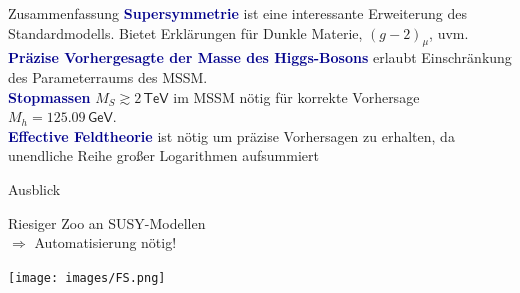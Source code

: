 \documentclass[hyperref={pdfpagelabels=false},ngerman]{beamer}
\newcommand{\eh}[1]{\,\mathsf{#1}}
\newcommand{\MS}{\ensuremath{M_S}}
\renewcommand{\emph}[1]{\textbf{\textcolor{darkblue}{#1}}}
\newcommand{\SM}{\ensuremath{\text{SM}}}
\newcommand{\MSSM}{\ensuremath{\text{MSSM}}}
\newcommand{\GeV}{\eh{GeV}}
\newcommand{\TeV}{\eh{TeV}}
\begin{document}
\begin{frame}{Zusammenfassung}
  \emph{Supersymmetrie} ist eine interessante Erweiterung des
  Standardmodells.  Bietet Erklärungen für Dunkle Materie,
  $(g-2)_\mu$, uvm.
  \\[1em]
  \emph{Präzise Vorhergesagte der Masse des Higgs-Bosons} erlaubt
  Einschränkung des Parameterraums des MSSM.
  \\[1em]
  \emph{Stopmassen} $\MS \gtrsim 2\TeV$ im MSSM nötig für korrekte
  Vorhersage $M_h = 125.09\GeV$.
  \\[1em]
  \emph{Effective Feldtheorie} ist nötig um präzise Vorhersagen zu
  erhalten, da unendliche Reihe großer Logarithmen aufsummiert
\end{frame}

\begin{frame}{Ausblick}
  \begin{center}
    \LARGE Riesiger Zoo an SUSY-Modellen\\ $\Rightarrow$ Automatisierung nötig!
  \end{center}
  \begin{center}
    \texttt{[image: images/FS.png]}
  \end{center}
\end{frame}

\end{document}
